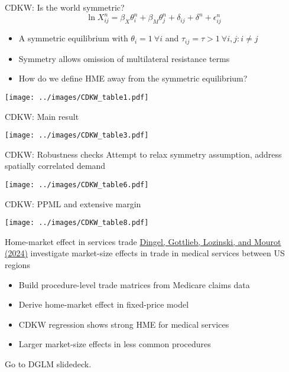 \documentclass[11pt,notes=hide,aspectratio=169]{beamer}
\begin{document}
\begin{frame}{CDKW: Is the world symmetric?}
\vspace{-3mm}
\begin{equation*}
	\ln X_{ij}^n = \beta_X \theta_i^n + \beta_M \theta_j^n +  \delta_{ij} + \delta^n + \epsilon_{ij}^n
\end{equation*}
\vspace{-5mm}
\begin{itemize}
	\item A symmetric equilibrium with $\theta_i = 1 \ \forall i$ and $\tau_{ij} = \tau > 1 \ \forall i,j:i \neq j$
	\item Symmetry allows omission of multilateral resistance terms
	\item How do we define HME away from the symmetric equilibrium?
\end{itemize}
\begin{center}\texttt{[image: ../images/CDKW\_table1.pdf]}\end{center}
\end{frame}
\begin{frame}{CDKW: Main result}
\begin{center}\texttt{[image: ../images/CDKW\_table3.pdf]}\end{center}
\end{frame}
\begin{frame}{CDKW: Robustness checks}
Attempt to relax symmetry assumption, address spatially correlated demand
\begin{center}\texttt{[image: ../images/CDKW\_table6.pdf]}\end{center}
\end{frame}
\begin{frame}{CDKW: PPML and extensive margin}
\begin{center}\texttt{[image: ../images/CDKW\_table8.pdf]}\end{center}
\end{frame}
\begin{frame}{Home-market effect in services trade}
\href{http://www.jdingel.com/research/DGLM_MSTMS.pdf}{Dingel, Gottlieb, Lozinski, and Mourot (2024)}
investigate market-size effects in trade in medical services between US regions
\begin{itemize}
\item Build procedure-level trade matrices from Medicare claims data
\item Derive home-market effect in fixed-price model
\item CDKW regression shows strong HME for medical services
\item Larger market-size effects in less common procedures
\end{itemize}
Go to DGLM slidedeck.
\end{frame}
\end{document}
